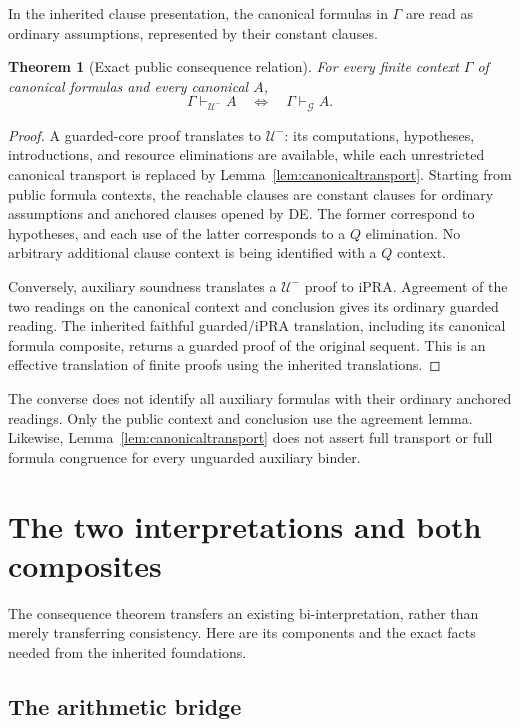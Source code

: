 \documentclass[11pt,letterpaper]{article}
\newtheorem{theorem}{Theorem}[section]
\theoremstyle{definition}
\newcommand{\UU}{\mathcal U^{-}}
\newcommand{\GG}{\mathcal G}
\begin{document}
In the inherited clause presentation, the canonical formulas in $\Gamma$
are read as ordinary assumptions, represented by their constant clauses.

\begin{theorem}[Exact public consequence relation]
\label{thm:consequence}
For every finite context $\Gamma$ of canonical formulas and every canonical
$A$,
\[
 \Gamma\vdash_{\UU}A\quad\Longleftrightarrow\quad\Gamma\vdash_{\GG}A.
\]
\end{theorem}
\begin{proof}
A guarded-core proof translates to $\UU$: its computations,
hypotheses, introductions, and resource eliminations are available, while
each unrestricted canonical transport is replaced by
Lemma~\ref{lem:canonicaltransport}. Starting from public formula contexts,
the reachable clauses are constant clauses for ordinary assumptions and
anchored clauses opened by DE. The former correspond to hypotheses, and
each use of the latter corresponds to a $Q$ elimination. No arbitrary
additional clause context is being identified with a $Q$ context.

Conversely, auxiliary soundness translates a $\UU$ proof to iPRA.
Agreement of the two readings on the canonical context and conclusion
gives its ordinary guarded reading. The inherited faithful guarded/iPRA
translation, including its canonical formula composite, returns a guarded
proof of the original sequent. This is an effective translation of finite
proofs using the inherited translations.
\end{proof}

The converse does not identify all auxiliary formulas with their ordinary
anchored readings. Only the public context and conclusion use the agreement
lemma. Likewise, Lemma~\ref{lem:canonicaltransport} does not assert full
transport or full formula congruence for every unguarded auxiliary binder.

\section{The two interpretations and both composites}
\label{sec:biinterpretation}

The consequence theorem transfers an existing bi-interpretation, rather
than merely transferring consistency. Here are its components and the
exact facts needed from the inherited foundations.

\subsection{The arithmetic bridge}
\end{document}
